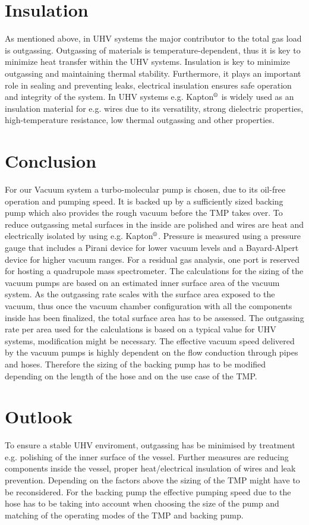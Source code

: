 \section{Insulation}

As mentioned above, in UHV systems the major contributor to the total gas load is outgassing.
Outgassing of materials is temperature-dependent, thus it is key to minimize heat transfer within the UHV systems.
Insulation is key to minimize outgassing and maintaining thermal stability.
Furthermore, it plays an important role in sealing and preventing leaks, electrical insulation ensures safe operation and integrity of the system.
In UHV systems e.g. Kapton$\textsuperscript{\textregistered}$ is widely used as an insulation material for e.g. wires due to its versatility, strong dielectric properties, high-temperature resistance, low thermal outgassing and other properties.


\section{Conclusion}

For our Vacuum system a turbo-molecular pump is chosen, due to its oil-free operation and pumping speed.
It is backed up by a sufficiently sized backing pump which also provides the rough vacuum before the TMP takes over.
To reduce outgassing metal surfaces in the inside are polished and wires are heat and electrically isolated by using e.g. Kapton$\textsuperscript{\textregistered}$.
Pressure is measured using a pressure gauge that includes a Pirani device for lower vacuum levels and a Bayard-Alpert device for higher vacuum ranges.
For a residual gas analysis, one port is reserved for hosting a quadrupole mass spectrometer. The calculations for the sizing of the vacuum pumps are based on an estimated inner surface area of the vacuum system. As the outgassing rate scales with the surface area exposed to the vacuum, thus once the vacuum chamber configuration with all the components inside has been finalized, the total surface area has to be assessed. The outgassing rate per area used for the calculations is based on a typical value for UHV systems, modification might be necessary. The effective vacuum speed delivered by the vacuum pumps is highly dependent on the flow conduction through pipes and hoses. Therefore the sizing of the backing pump has to be modified depending on the length of the hose and on the use case of the TMP.


\section{Outlook}
To ensure a stable UHV enviroment, outgassing has be minimised by treatment e.g. polishing of the inner surface of the vessel. Further measures are reducing components inside the vessel, proper heat/electrical insulation of wires and leak prevention. Depending on the factors above the sizing of the TMP might have to be reconsidered. For the backing pump the effective pumping speed due to the hose has to be taking into account when choosing the size of the pump and matching of the operating modes of the TMP and backing pump.
